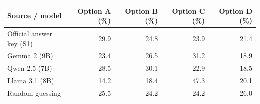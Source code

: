 \begin{tabular}{@{}lrrrr@{}}
\toprule
Source / model & Option A (\%) & Option B (\%) & Option C (\%) & Option D (\%) \\
\midrule
Official answer key (S1) & 29.9 & 24.8 & 23.9 & 21.4 \\
Gemma 2 (9B) & 23.4 & 26.5 & 31.2 & 18.9 \\
Qwen 2.5 (7B) & 28.5 & 30.1 & 22.9 & 18.5 \\
Llama 3.1 (8B) & 14.2 & 18.4 & 47.3 & 20.1 \\
Random guessing & 25.5 & 24.2 & 24.2 & 26.0 \\
\bottomrule
\end{tabular}
